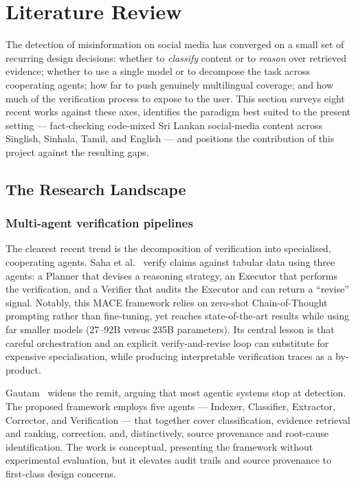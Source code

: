 \documentclass[12pt,a4paper]{article}
\begin{document}
\section{Literature Review}
The detection of misinformation on social media has converged on a small set of
recurring design decisions: whether to \textit{classify} content or to
\textit{reason} over retrieved evidence; whether to use a single model or to
decompose the task across cooperating agents; how far to push genuinely
multilingual coverage; and how much of the verification process to expose to the
user. This section surveys eight recent works against these axes, identifies the
paradigm best suited to the present setting --- fact-checking code-mixed Sri
Lankan social-media content across Singlish, Sinhala, Tamil, and English --- and
positions the contribution of this project against the resulting gaps.

\subsection{The Research Landscape}

\subsubsection{Multi-agent verification pipelines}
The clearest recent trend is the decomposition of verification into specialised,
cooperating agents. Saha et al.~\cite{mace} verify claims against tabular data
using three agents: a Planner that devises a reasoning strategy, an Executor that
performs the verification, and a Verifier that audits the Executor and can return
a ``revise'' signal. Notably, this MACE framework relies on zero-shot
Chain-of-Thought prompting rather than fine-tuning, yet reaches state-of-the-art
results while using far smaller models (27--92B versus 235B parameters). Its
central lesson is that careful orchestration and an explicit verify-and-revise
loop can substitute for expensive specialisation, while producing interpretable
verification traces as a by-product.

Gautam~\cite{gautam} widens the remit, arguing that most agentic systems stop at
detection. The proposed framework employs five agents --- Indexer, Classifier,
Extractor, Corrector, and Verification --- that together cover classification,
evidence retrieval and ranking, correction, and, distinctively, source provenance
and root-cause identification. The work is conceptual, presenting the framework
without experimental evaluation, but it elevates audit trails and source
provenance to first-class design concerns.
\end{document}
